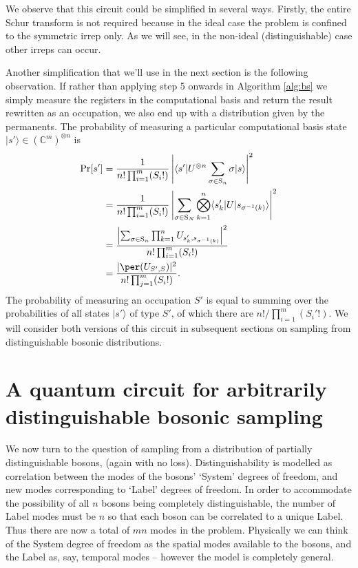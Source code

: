 We observe that this circuit could be simplified in several ways.
Firstly, the entire Schur transform is not required because in the ideal case the problem is confined to the symmetric irrep only.
As we will see, in the non-ideal (distinguishable) case other irreps can occur.

Another simplification that we'll use in the next section is the following observation.
If rather than applying step 5 onwards in Algorithm \ref{alg:bs} we simply measure the registers in the computational basis and return the result rewritten as an occupation, we also end up with a distribution given by the permanents. 
The probability of measuring a particular computational basis state $|s'\rangle \in (\mathbb{C}^m)^{\otimes n}$ is
\begin{align}
\textrm{Pr}[s'] 
&= \frac{1}{n!\prod_{i=1}^m (S_i!)}\left|\langle s'|U^{\otimes n}\sum_{\sigma \in \textrm{S}_n}\sigma|s\rangle\right|^2\\
&= \frac{1}{n!\prod_{i=1}^m (S_i!)}\left|\sum_{\sigma \in \textrm{S}_N}\bigotimes_{k = 1}^n\langle s_k'|U|s_{\sigma^{-1}(k)}\rangle\right|^2\\
&= \frac{\left|\sum_{\sigma \in \textrm{S}_n}\prod_{k = 1}^n U_{s_k', s_{\sigma^{-1}(k)}}\right|^2}{n!\prod_{i=1}^m (S_i!)} \\
&= \frac{|\per(U_{S',S})|^2}{n!\prod_{j=1}^m (S_i!)}.
\end{align}
The probability of measuring an occupation $S'$ is equal to summing over the probabilities of all states $|s'\rangle$ of type $S'$, of which there are $n!/\prod_{i=1}^m (S_i'!)$.
We will consider both versions of this circuit in subsequent sections on sampling from distinguishable bosonic distributions.

\section{A quantum circuit for arbitrarily distinguishable bosonic sampling}
\label{sec:qc-noisy}

We now turn to the question of sampling from a distribution of partially distinguishable bosons, (again with no loss).
Distinguishability is modelled as correlation between the modes of the bosons' `System'  degrees of freedom, and new modes corresponding to `Label' degrees of freedom.
In order to accommodate the possibility of all $n$ bosons being completely distinguishable, the number of Label modes must be $n$ so that each boson can be correlated to a unique Label.
Thus there are now a total of $mn$ modes in the problem.
Physically we can think of the System degree of freedom as the spatial modes available to the bosons, and the Label as, say, temporal modes -- however the model is completely general. 

